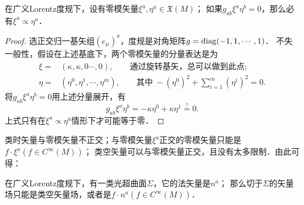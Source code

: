\begin{proposition}\label{chnull:thm_null-self}
    在广义Lorentz度规下，设有零模矢量$\xi^a, \eta^a \in \mathfrak{X}(M)$；
    如果$g_{ab}\xi^a \eta^b=0$，那么必有$\xi^a\propto \eta^a$．
\end{proposition}
\begin{proof}
    选正交归一基矢组$(e_\mu)^a$，度规是对角矩阵$g={\rm diag}(-1,1,\cdots,1)$．
    不失一般性，假设在上述基底下，两个零模矢量的分量表达是为
    \begin{align}
        \xi=&(\kappa,\kappa,0 \cdots, 0),\qquad \text{通过旋转基矢，总可以做到此点}; \\
        \eta=&(\eta^0,\eta^1, \cdots, \eta^m),\qquad\text{其中}\  -(\eta^0)^2 + \sum_{i=1}^{m}(\eta^i)^2 =0.
    \end{align}
    将$g_{ab}\xi^a \eta^b=0$用上述分量展开，有 %
    \begin{equation}
        g_{ab}\xi^a \eta^b= -\kappa \eta^0 + \kappa \eta^1 \overset{?}{=} 0.
    \end{equation}
    上式只有在$\xi^a\propto \eta^a$情形下才可能等于零．
\end{proof}
类时矢量与零模矢量不正交；与零模矢量$\xi^a$正交的零模矢量只能是$f\cdot \xi^a(f \in C^\infty(M))$；
类空矢量可以与零模矢量正交，且没有太多限制．由此可得：

\begin{proposition}\label{chnull:thm_null-sxi}
    在广义Lorentz度规下，有一类光超曲面$\Sigma$，它的法矢量是$n^a$；
    那么切于$\Sigma$的矢量场只能是类空矢量场，或者是$f\cdot n^a(f \in C^\infty(M))$．
\end{proposition}



